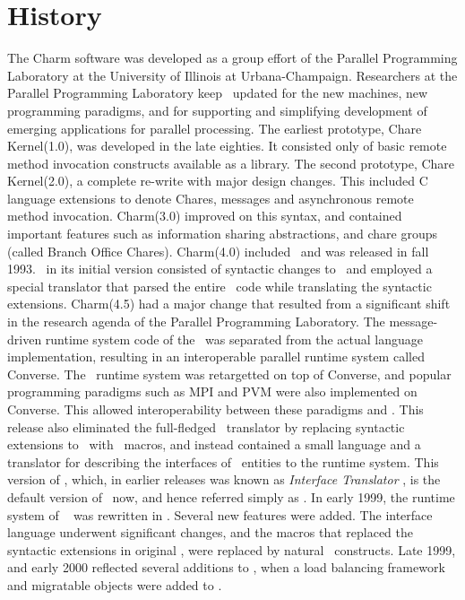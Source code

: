 \section{History}

The {\sc Charm} software was developed as a group effort of the Parallel
Programming Laboratory at the University of Illinois at Urbana-Champaign.
Researchers at the Parallel Programming Laboratory keep \charmpp\ updated for
the new machines, new programming paradigms, and for supporting and simplifying
development of emerging applications for parallel processing.  The earliest
prototype, Chare Kernel(1.0), was developed in the late eighties. It consisted
only of basic remote method invocation constructs available as a library.  The
second prototype, Chare Kernel(2.0), a complete re-write with major design
changes.  This included C language extensions to denote Chares, messages and
asynchronous remote method invocation.  {\sc Charm}(3.0) improved on this
syntax, and contained important features such as information sharing
abstractions, and chare groups (called Branch Office Chares).  {\sc Charm}(4.0)
included \charmpp\ and was released in fall 1993.  \charmpp\ in its initial
version consisted of syntactic changes to \CC\ and employed a special
translator that parsed the entire \CC\ code while translating the syntactic
extensions.  {\sc Charm}(4.5)  had a major change that resulted from a
significant shift in the research agenda of the Parallel Programming
Laboratory. The message-driven runtime system code of the \charmpp\ was
separated from the actual language implementation, resulting in an
interoperable parallel runtime system called {\sc
Converse}. The \charmpp\ runtime system was
retargetted on top of {\sc Converse}, and popular programming paradigms such as
MPI and PVM were also implemented on {\sc Converse}. This allowed
interoperability between these paradigms and \charmpp. This release also
eliminated the full-fledged \charmpp\ translator by replacing syntactic
extensions to \CC\ with \CC\ macros, and instead contained a small language and
a translator for describing the interfaces of \charmpp\ entities to the runtime
system.  This version of \charmpp, which, in earlier releases was known as {\em
Interface Translator \charmpp}, is the default version of \charmpp\ now, and
hence referred simply as {\bf \charmpp}.  In early 1999, the runtime system of
\charmpp\ 
was rewritten in \CC.
Several new features were added. The interface language underwent significant
changes, and the macros that replaced the syntactic extensions in original
\charmpp, were replaced by natural \CC\ constructs. Late 1999, and early
2000 reflected several additions to \charmpp{}, when a load balancing
framework and migratable objects were added to \charmpp{}.

